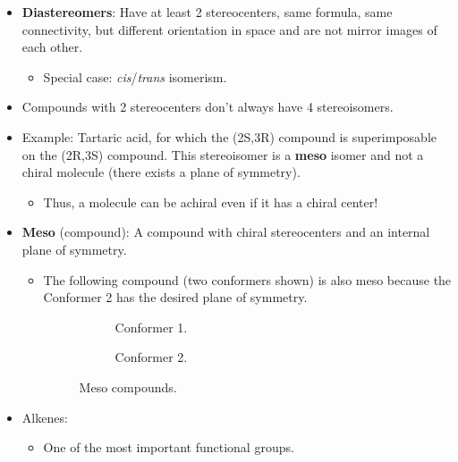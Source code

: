 \documentclass[../notes.tex]{subfiles}
\begin{document}
\begin{itemize}
\begin{itemize}
    \end{itemize}
    \item \textbf{Diastereomers}: Have at least 2 stereocenters, same formula, same connectivity, but different orientation in space and are not mirror images of each other.
    \begin{itemize}
        \item Special case: \emph{cis}/\emph{trans} isomerism.
    \end{itemize}
    \item Compounds with 2 stereocenters don't always have 4 stereoisomers.
    \item Example: Tartaric acid, for which the (2S,3R) compound is superimposable on the (2R,3S) compound. This stereoisomer is a \textbf{meso} isomer and not a chiral molecule (there exists a plane of symmetry).
    \begin{itemize}
        \item Thus, a molecule can be achiral even if it has a chiral center!
    \end{itemize}
    \item \textbf{Meso} (compound): A compound with chiral stereocenters and an internal plane of symmetry.
    \begin{itemize}
        \item The following compound (two conformers shown) is also meso because the Conformer 2 has the desired plane of symmetry.
        \begin{figure}[h!]
            \centering
            \footnotesize
            \begin{subfigure}[b]{0.25\linewidth}
                \centering
                \caption{Conformer 1.}
                \label{fig:mesoCompounda}
            \end{subfigure}
            \begin{subfigure}[b]{0.25\linewidth}
                \centering
                \caption{Conformer 2.}
                \label{fig:mesoCompoundb}
            \end{subfigure}
            \caption{Meso compounds.}
            \label{fig:mesoCompound}
        \end{figure}
    \end{itemize}
    \item Alkenes:
    \begin{itemize}
        \item One of the most important functional groups.

\end{itemize}
\end{itemize}
\end{document}
